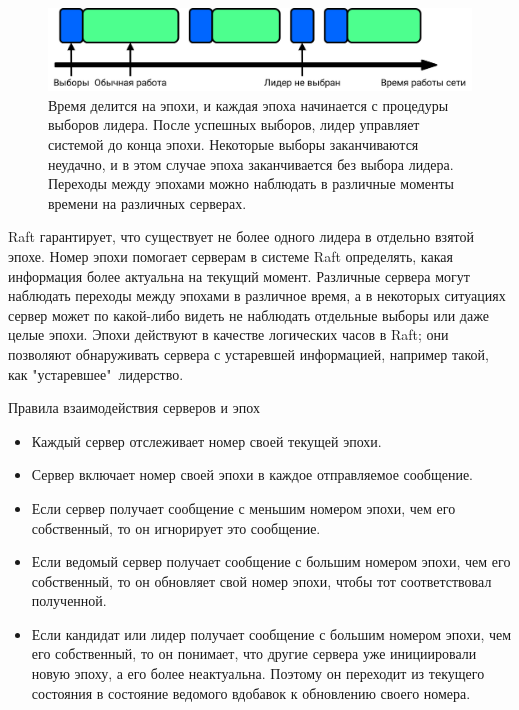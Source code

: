 \documentclass[subf, href, colorlinks=true, 14pt,
times, mtpro, specialist]{disser}
\theoremstyle{definition}
\begin{document}
\begin{figure}[H]
\centering
\vspace{0.4cm}
\hspace*{0.2cm}
\includegraphics[width=1\textwidth]{src/pics/terms.png}
\caption{Время делится на эпохи, и каждая эпоха начинается с процедуры выборов лидера. После успешных выборов, лидер управляет системой до конца эпохи. Некоторые выборы заканчиваются неудачно, и в этом случае эпоха заканчивается без выбора лидера. Переходы между эпохами можно наблюдать в различные моменты времени на различных серверах.}
\label{fig:terms}
\end{figure}

Raft гарантирует, что существует не более одного лидера в отдельно взятой эпохе.
Номер эпохи помогает серверам в системе Raft определять, какая информация более актуальна на текущий момент. 
Различные сервера могут наблюдать переходы между эпохами в различное время, а в некоторых ситуациях сервер может по какой-либо видеть не наблюдать отдельные выборы или даже целые эпохи. Эпохи действуют в качестве логических часов в Raft; они позволяют обнаруживать сервера с устаревшей информацией, например такой, как "устаревшее"\ лидерство.

Правила взаимодействия серверов и эпох
\begin{itemize}
\item Каждый сервер отслеживает номер своей текущей эпохи.
\item Сервер включает номер своей эпохи в каждое отправляемое сообщение.
\item Если сервер получает сообщение с меньшим номером эпохи, чем его собственный, то он игнорирует это сообщение.
\item Если ведомый сервер получает сообщение с большим номером эпохи, чем его собственный, то он обновляет свой номер эпохи, чтобы тот соответствовал полученной.
\item Если кандидат или лидер получает сообщение с большим номером эпохи, чем его собственный, то он понимает, что другие сервера уже инициировали новую эпоху, а его более неактуальна. Поэтому он переходит из текущего состояния в состояние ведомого вдобавок к обновлению своего номера.
\end{itemize}
\end{document}
